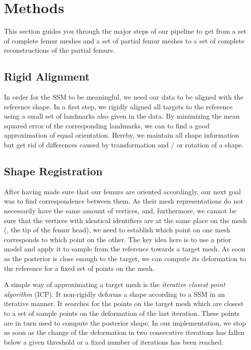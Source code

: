 \section{Methods}
\label{sec:methods}

This section guides you through the major steps of our pipeline to get from a set of complete femur meshes and a set of partial femur meshes to a set of complete reconstructions of the partial femurs.


\subsection{Rigid Alignment}
\label{subsec:rigid}

In order for the SSM to be meaningful, we need our data to be aligned with the reference shape.
In a first step, we rigidly aligned all targets  to the reference using a small set of landmarks also given in the data.
By minimizing the mean squared error of the corresponding landmarks, we can to find a good approximation of equal orientation.
Hereby, we maintain all shape information but get rid of differences caused by transformation and / or rotation of a shape.


\subsection{Shape Registration}
\label{subsec:registr}

After having made sure that our femurs are oriented accordingly, our next goal was to find correspondence between them.
As their mesh representations do not necessarily have the same amount of vertices, and, furthermore, we cannot be sure that the vertices with identical identifiers are at the same place on the mesh (\eg, the tip of the femur head), we need to establish which point on one mesh corresponds to which point on the other.
The key idea here is to use a prior model  and apply it to sample from the reference towards a target mesh.
As soon as the posterior  is close enough to the target, we can compute its deformation to the reference for a fixed set of points on the mesh.

A simple way of approximating a target mesh is the \emph{iterative closest point algorithm} (ICP).
It non-rigidly deforms a shape according to a SSM in an iterative manner.
It searches for the points on the target mesh which are closest to a set of sample points on the deformation of the last iteration.
These points are in turn used to compute the posterior  shape.
In our implementation, we stop as soon as the change of the deformation in two consecutive iterations has fallen below a given threshold or a fixed number of iterations has been reached.

